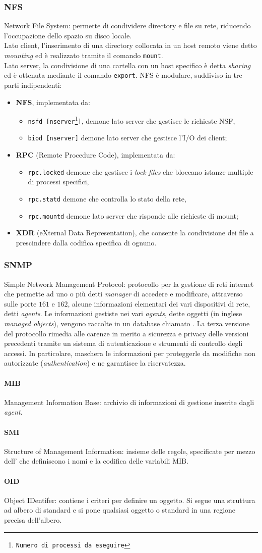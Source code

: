 \documentclass[a4paper, twoside]{article}
\def\code#1{\texttt{#1}}
\def\subsub#1{\subsubsection{#1}\label{#1}}
\def\para#1{\paragraph{#1}\label{#1}}
\def\vedi#1{\nameref{#1}}
\def\italic#1{\textit{#1}}
\begin{document}
\subsub{NFS}
Network File System: permette di condividere directory e file su rete, riducendo l'occupazione dello spazio su disco locale.\\Lato client, l'inserimento di una directory collocata in un host remoto viene detto \italic{mounting} ed è realizzato tramite il comando \code{mount}.\\
Lato server, la condivisione di una cartella con un host specifico è detta \italic{sharing} ed è ottenuta mediante il comando \code{export}.
NFS è modulare, suddiviso in tre parti indipendenti:
\begin{itemize}
\item \textbf{NFS}, implementata da: 
\begin{itemize}
\item \code{nsfd [nserver\footnote{Numero di processi da eseguire}]}, demone lato server  che gestisce le richieste NSF,
\item \code{biod [nserver]} demone lato server che gestisce l'I/O dei client;
\end{itemize}
\item \textbf{RPC} (Remote Procedure Code), implementata da:
\begin{itemize}
\item \code{rpc.locked} demone che gestisce i \italic{lock files} che bloccano istanze multiple di processi specifici,
\item \code{rpc.statd} demone che controlla lo stato della rete,
\item \code{rpc.mountd} demone lato server che risponde alle richieste di mount;
\end{itemize}
\item \textbf{XDR} (eXternal Data Representation), che consente la condivisione dei file a prescindere dalla codifica specifica di ognuno.
\end{itemize} 
\subsub{SNMP}  %
Simple Network Management Protocol: protocollo per la gestione di reti internet che permette ad uno o più \vedi{DTE} detti \italic{manager} di accedere e modificare, attraverso \vedi{UDP} sulle porte $161$ e $162$, alcune informazioni elementari dei vari dispositivi di rete, detti \italic{agents}. Le informazioni gestiste nei vari \italic{agents}, dette 
oggetti (in inglese \italic{managed objects}), vengono raccolte in un database chiamato \vedi{MIB}.
La terza versione del protocollo rimedia alle carenze in merito a sicurezza e privacy delle versioni precedenti tramite un sistema di autenticazione e strumenti di controllo degli accessi. In particolare, maschera le informazioni per proteggerle da modifiche non autorizzate (\italic{authentication}) e ne garantisce la riservatezza.
\para{MIB} Management Information Base: archivio di informazioni di gestione inserite dagli \textit{agent}.
\para{SMI} Structure of Management Information: insieme delle regole, specificate per mezzo dell'\vedi{ASN.1} che definiscono i nomi e la codifica delle variabili MIB. 
\para{OID} Object IDentifer: contiene i criteri per definire un
oggetto. Si segue una struttura ad albero di standard e
si pone qualsiasi oggetto o standard in una regione
precisa dell’albero. 
 
\end{document}
